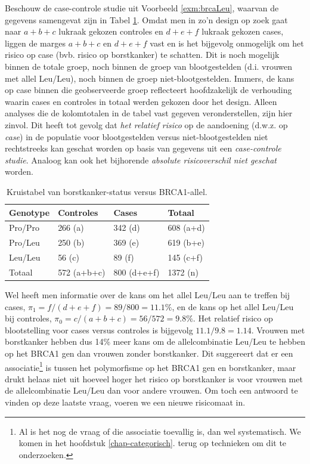 \documentclass[
  12pt,dutch,coursenotes]{book}
\theoremstyle{definition}
\theoremstyle{definition}
\theoremstyle{definition}
\theoremstyle{definition}
\theoremstyle{remark}
\begin{document}
Beschouw de case-controle studie uit Voorbeeld \ref{exm:brcaLeu}, waarvan
de gegevens samengevat zijn in Tabel \ref{tab:leu2}. Omdat men in
zo'n design op zoek gaat naar \(a+b+c\) lukraak gekozen controles en \(d+e+f\) lukraak
gekozen cases, liggen de marges \(a+b+c\) en \(d+e+f\) vast en is het bijgevolg
onmogelijk om het risico op case (bvb. risico op borstkanker) te schatten. Dit is noch mogelijk binnen de
totale groep, noch binnen de groep van blootgestelden (d.i. vrouwen met allel Leu/Leu), noch binnen de groep
niet-blootgestelden. Immers, de kans op case binnen die geobserveerde groep reflecteert hoofdzakelijk de verhouding waarin cases en controles in totaal werden gekozen door het design. Alleen analyses die de kolomtotalen
in de tabel vast gegeven veronderstellen, zijn hier zinvol. Dit heeft tot
gevolg dat \emph{het relatief risico} op de aandoening (d.w.z. op \emph{case})
in de populatie voor blootgestelden versus niet-blootgestelden niet
rechtstreeks kan geschat worden op basis van gegevens uit een \emph{case-controle studie}. Analoog kan ook het bijhorende \emph{absolute risicoverschil niet geschat} worden.

\begin{table}

\caption{\label{tab:leu2}Kruistabel van borstkanker-status versus BRCA1-allel.}
\centering
\begin{tabular}[t]{llll}
\toprule
Genotype & Controles & Cases & Totaal\\
\midrule
Pro/Pro & 266 (a) & 342 (d) & 608 (a+d)\\
Pro/Leu & 250 (b) & 369 (e) & 619 (b+e)\\
Leu/Leu & 56 (c) & 89 (f) & 145 (c+f)\\
Totaal & 572 (a+b+c) & 800 (d+e+f) & 1372 (n)\\
\bottomrule
\end{tabular}
\end{table}

Wel heeft men informatie over de kans om het allel Leu/Leu aan te treffen bij cases, \(\pi_1=f/(d+e+f)=89/800=11.1\%\), en de kans op het allel Leu/Leu bij controles, \(\pi_0=c/(a+b+c)=56/572=9.8\%\). Het relatief risico op blootstelling voor cases versus
controles is bijgevolg \(11.1/9.8=1.14\). Vrouwen met borstkanker hebben dus
14\% meer kans om de allelcombinatie Leu/Leu te hebben op het BRCA1 gen dan vrouwen zonder borstkanker.
Dit suggereert dat er
een associatie\footnote{Al is het nog de vraag of die associatie toevallig is, dan wel systematisch. We komen in het hoofdstuk \ref{chap-categorisch}. terug op technieken om dit te onderzoeken.} is tussen het polymorfisme op het BRCA1 gen en borstkanker, maar drukt helaas niet uit hoeveel hoger het risico op borstkanker is voor vrouwen met de allelcombinatie Leu/Leu dan voor andere vrouwen. Om toch een antwoord te vinden op deze laatste vraag, voeren we een nieuwe risicomaat in.
\end{document}

